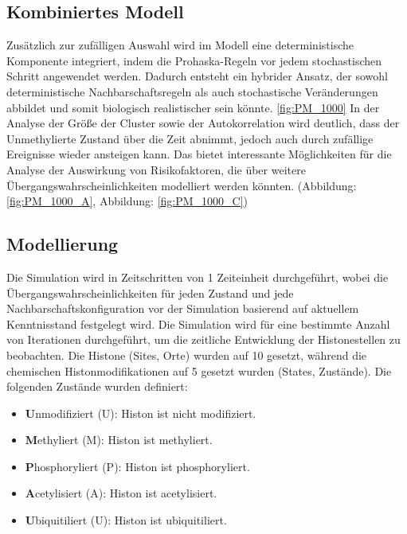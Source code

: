 \documentclass{SeminarV2}
\begin{document}
\subsection{Kombiniertes Modell}
Zusätzlich zur zufälligen Auswahl wird im Modell eine deterministische Komponente integriert, indem die Prohaska-Regeln vor jedem stochastischen Schritt angewendet werden. Dadurch entsteht ein hybrider Ansatz, der sowohl deterministische Nachbarschaftsregeln als auch stochastische Veränderungen abbildet und somit biologisch realistischer sein könnte.
\ref{fig:PM_1000}
In der Analyse der Größe der Cluster sowie der Autokorrelation wird deutlich, dass der Unmethylierte Zustand über die Zeit abnimmt, jedoch auch durch zufällige Ereignisse wieder ansteigen kann.
Das bietet interessante Möglichkeiten für die Analyse der Auswirkung von Risikofaktoren, die über weitere Übergangswahrscheinlichkeiten modelliert werden könnten. (Abbildung: \ref{fig:PM_1000_A}, Abbildung: \ref{fig:PM_1000_C})

\subsection{Modellierung}
Die Simulation wird in Zeitschritten von 1 Zeiteinheit durchgef\"{u}hrt, wobei die \"{U}bergangswahrscheinlichkeiten f\"{u}r jeden Zustand und jede Nachbarschaftskonfiguration 
vor der Simulation basierend auf aktuellem Kenntnisstand festgelegt wird.
Die Simulation wird f\"{u}r eine bestimmte Anzahl von Iterationen durchgef\"{u}hrt, um die zeitliche Entwicklung der Histonestellen zu beobachten.
Die Histone (Sites, Orte) wurden auf 10 gesetzt, während die chemischen Histonmodifikationen auf 5 gesetzt wurden (States, Zustände).
Die folgenden Zust\"{a}nde wurden definiert:
\begin{itemize}
  \item \textbf{U}nmodifiziert (U): Histon ist nicht modifiziert.
  \item \textbf{M}ethyliert (M): Histon ist methyliert.
  \item \textbf{P}hosphoryliert (P): Histon ist phosphoryliert.
  \item \textbf{A}cetylisiert (A): Histon ist acetylisiert.
  \item \textbf{U}biquitiliert (U): Histon ist ubiquitiliert.
\end{itemize}
\end{document}

